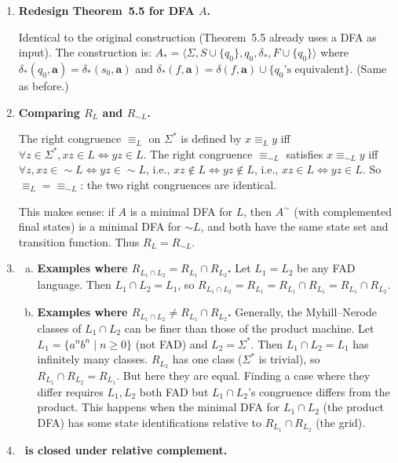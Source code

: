 \begin{enumerate}[{5.}1. ]
\item \textbf{Redesign Theorem~5.5 for DFA $A$.}

Identical to the original construction (Theorem~5.5 already uses a DFA as input).  The construction is:
$A_*=\langle\Sigma,S\cup\{q_0\},q_0,\delta_*,F\cup\{q_0\}\rangle$ where $\delta_*(q_0,\pmb{a})=\delta_*(s_0,\pmb{a})$ and $\delta_*(f,\pmb{a})=\delta(f,\pmb{a})\cup\{q_0\text{'s equivalent}\}$.  (Same as before.)

\item \textbf{Comparing $R_L$ and $R_{\sim L}$.}

The right congruence $\equiv_L$ on $\Sigma^*$ is defined by $x\equiv_L y$ iff $\forall z\in\Sigma^*,xz\in L\Leftrightarrow yz\in L$.  The right congruence $\equiv_{\sim L}$ satisfies $x\equiv_{\sim L}y$ iff $\forall z,xz\in\sim L\Leftrightarrow yz\in\sim L$, i.e., $xz\notin L\Leftrightarrow yz\notin L$, i.e., $xz\in L\Leftrightarrow yz\in L$.  So $\equiv_L=\equiv_{\sim L}$: the two right congruences are identical.

This makes sense: if $A$ is a minimal DFA for $L$, then $A^\sim$ (with complemented final states) is a minimal DFA for $\sim L$, and both have the same state set and transition function.  Thus $R_L=R_{\sim L}$.

\item \begin{enumerate}[(a)]
  \item \textbf{Examples where $R_{L_1\cap L_2}=R_{L_1}\cap R_{L_2}$.}
  Let $L_1=L_2$ be any FAD language.  Then $L_1\cap L_2=L_1$, so $R_{L_1\cap L_2}=R_{L_1}=R_{L_1}\cap R_{L_1}=R_{L_1}\cap R_{L_2}$.

  \item \textbf{Examples where $R_{L_1\cap L_2}\neq R_{L_1}\cap R_{L_2}$.}
  Generally, the Myhill--Nerode classes of $L_1\cap L_2$ can be finer than those of the product machine.  Let $L_1=\{a^nb^n\mid n\ge 0\}$ (not FAD) and $L_2=\Sigma^*$.  Then $L_1\cap L_2=L_1$ has infinitely many classes.  $R_{L_2}$ has one class ($\Sigma^*$ is trivial), so $R_{L_1}\cap R_{L_2}=R_{L_1}$.  But here they are equal.  Finding a case where they differ requires $L_1,L_2$ both FAD but $L_1\cap L_2$'s congruence differs from the product.  This happens when the minimal DFA for $L_1\cap L_2$ (the product DFA) has some state identifications relative to $R_{L_1}\cap R_{L_2}$ (the grid).
\end{enumerate}

\item \textbf{\DSIG\ is closed under relative complement.}


\end{enumerate}
